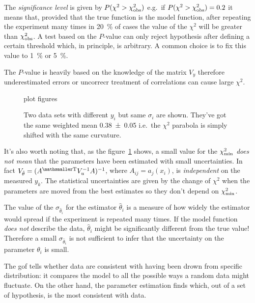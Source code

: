 The \emph{significance level} is given by $P(\chi^2 > \chi^2_\textup{obs})$ e.g.~if $P(\chi^2 > \chi^2_\textup{obs}) = \num{.2}$ it means that, provided that the true function is the model function, after repeating the experiment many times in \SI{20}{\percent} of cases the value of the $\chi^2$ will be greater than $\chi^2_\textup{obs}$.
A test based on the $P$-value can only reject hypothesis after defining a certain threshold which, in principle, is arbitrary.
A common choice is to fix this value to \SI{1}{\percent} or \SI{5}{\percent}.



The $P$-value is heavily based on the knowledge of the matrix $V_y$ therefore underestimated errors or uncorrecr treatment of correlations can cause large $\chi^2$.
\begin{figure}
	\centering
	\color{red}
	plot figures
	\caption{Two data sets with different $y_i$ but same $\sigma_i$ are shown. They've got the same weighted mean \num{.38\pm.05} i.e.~the $\chi^2$ parabola is simply shifted with the same curvature.}
	\label{fig:ChiSquareMindBlow}
\end{figure}
It's also worth noting that, as the figure~\ref{fig:ChiSquareMindBlow} shows, a small value for the $\chi^2_\textup{min}$ \emph{does not mean} that the parameters have been estimated with small uncertainties.
In fact $V_{\hat{\theta}} = (\transpose{A}V_u^{-1}A)^{-1}$, where $A_{ij} = a_j(x_i)$, is \emph{independent} on the measured $y_k$.
The statistical uncertainties are given by the change of $\chi^2$ when the parameters are moved from the best estimates so they don't depend on $\chi^2_\textup{min}$.


The value of the $\sigma_{\hat\theta_i}$ for the estimator $\hat\theta_i$ is a measure of how widely the estimator would spread if the experiment is repeated many times.
If the model function \emph{does not} describe the data, $\hat\theta_i$ might be significantly different from the true value!
Therefore a small $\sigma_{\hat\theta_i}$ is not sufficient to infer that the uncertainty on the parameter $\theta_i$ is small.



The \ac{gof} tells whether data are consistent {\color{red}with having been drown} from specific distribution: it compares the model to all the possible ways a random data might fluctuate.
On the other hand, the parameter estimation finds which, out of a set of hypothesis, is the most consistent with data.

